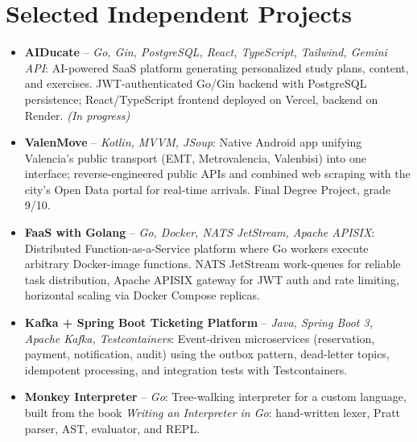\documentclass[11pt,a4paper,sans]{moderncv}
\begin{document}
\section{Selected Independent Projects}
\vspace{1pt}
\begin{itemize}

\item \textbf{AIDucate} -- \textit{Go, Gin, PostgreSQL, React, TypeScript, Tailwind, Gemini API}: AI-powered SaaS platform generating personalized study plans, content, and exercises. JWT-authenticated Go/Gin backend with PostgreSQL persistence; React/TypeScript frontend deployed on Vercel, backend on Render. \textit{(In progress)}

\item \textbf{ValenMove} -- \textit{Kotlin, MVVM, JSoup}: Native Android app unifying Valencia's public transport (EMT, Metrovalencia, Valenbisi) into one interface; reverse-engineered public APIs and combined web scraping with the city's Open Data portal for real-time arrivals. Final Degree Project, grade 9/10.

\item \textbf{FaaS with Golang} -- \textit{Go, Docker, NATS JetStream, Apache APISIX}: Distributed Function-as-a-Service platform where Go workers execute arbitrary Docker-image functions. NATS JetStream work-queues for reliable task distribution, Apache APISIX gateway for JWT auth and rate limiting, horizontal scaling via Docker Compose replicas.

\item \textbf{Kafka + Spring Boot Ticketing Platform} -- \textit{Java, Spring Boot 3, Apache Kafka, Testcontainers}: Event-driven microservices (reservation, payment, notification, audit) using the outbox pattern, dead-letter topics, idempotent processing, and integration tests with Testcontainers.

\item \textbf{Monkey Interpreter} -- \textit{Go}: Tree-walking interpreter for a custom language, built from the book \textit{Writing an Interpreter in Go}: hand-written lexer, Pratt parser, AST, evaluator, and REPL.

\end{itemize}

\end{document}
